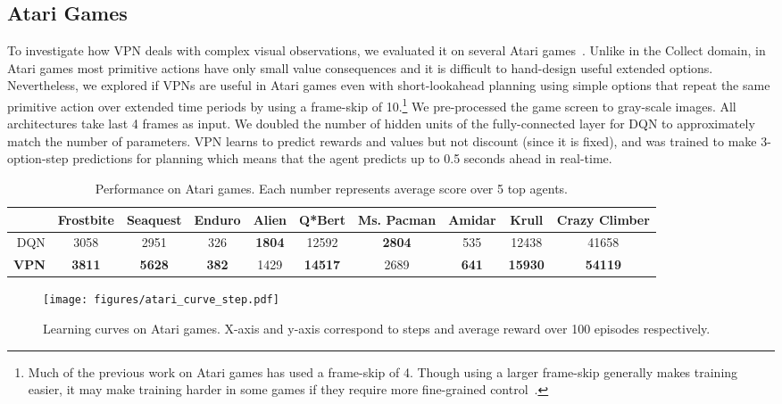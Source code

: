 \documentclass{article}
\newcommand{\cutsubsectiondown}{\vspace*{-0.03in}}
\begin{document}
\subsection{Atari Games} \label{exp:atari}
\cutsubsectiondown
To investigate how VPN deals with complex visual observations, we evaluated it on several Atari games~\cite{bellemare2012arcade}. 
Unlike in the Collect domain, in Atari games most primitive actions have only small value consequences and it is difficult to hand-design useful extended options. 
Nevertheless, we explored if VPNs are useful in Atari games even with short-lookahead planning using simple options that repeat the same primitive action over extended time periods by using a frame-skip of 10.\footnote{Much of the previous work on Atari games has used a frame-skip of 4. Though using a larger frame-skip generally makes training easier, it may make training harder in some games if they require more fine-grained control~\citep{Lakshminarayanan2017DynamicAR}.} 
We pre-processed the game screen to  gray-scale images. All architectures take last 4 frames as input. We doubled the number of hidden units of the fully-connected layer for DQN to approximately match the number of parameters. 
VPN learns to predict rewards and values but not discount (since it is fixed), and was trained to make 3-option-step predictions for planning which means that the agent predicts up to 0.5 seconds ahead in real-time.

\begin{table}[t]
  \small
  \setlength{\tabcolsep}{3pt}
  \caption{Performance on Atari games. Each number represents average score over 5 top agents. }
  \label{tab:atari}
  \centering
  \begin{tabular}{rccccccccc}
    \toprule
    & Frostbite & Seaquest & Enduro & Alien & Q*Bert & Ms. Pacman & Amidar & Krull & Crazy Climber \\
    \midrule
    DQN 			& 3058  & 2951 & 326 & \textbf{1804} & 12592 & \textbf{2804} & 535 & 12438 & 41658 \\
    \textbf{VPN}	& \textbf{3811} & \textbf{5628} & \textbf{382} & 1429 & \textbf{14517} & 2689 & \textbf{641} & \textbf{15930} & \textbf{54119}  \\
    \bottomrule
  \end{tabular}
\end{table}

\begin{figure}[t]
	\centering
	\texttt{[image: figures/atari\_curve\_step.pdf]}  
	\vspace{-5pt}
	\caption{Learning curves on Atari games. X-axis and y-axis correspond to steps and average reward over 100 episodes respectively. } 
\label{fig:atari}
\end{figure}
\end{document}
